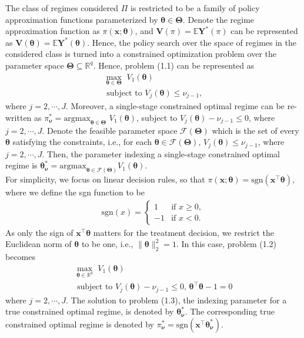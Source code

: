 \documentclass[12pt]{article}
\newcommand{\itl}{\intercal}
\newcommand{\bs}{ \boldsymbol}
\newcommand{\mb}{\mathbb}
\newcommand{\ml}{\mathcal}
\newcommand{\lt}{\left}
\newcommand{\rt}{\right}
\begin{document}
The class of regimes considered $\Pi$ is restricted to be a family of policy approximation functions parameterized by $\bs{\theta} \in \bs{\Theta}$. Denote the regime approximation function as $\pi(\bs{x}; \bs{\theta})$, and $\bs{V}(\pi) = \mb{E} {\bs{Y}^{*}\lt(\pi\rt)}$ can be represented as $\bs{V}(\bs{\theta}) = \mb{E} {\bs{Y}^{*}\lt(\bs{\theta}\rt)}$. Hence, the policy search over the space of regimes in the considered class is turned into a constrained optimization problem over the parameter space $\bs{\Theta} \subseteq \mb{R}^q$. Hence, problem (1.1) can be represented as 
\begin{equation}
\begin{gathered}
\max_{\bs{\theta} \in \bs{\Theta}} \,\, V_1\lt(\bs{\theta}\rt) \\
\text{ subject to } V_j\lt(\bs{\theta}\rt) \le \nu_{j-1},
\end{gathered}
\end{equation}  where $j = 2, \cdots, J$.  Moreover, a single-stage constrained optimal regime can be re-written as $\pi^*_{\bs{\nu}} = \text{argmax}_{\bs{\theta} \in \bs{\Theta}} \,\, V_1(\bs{\theta})$, subject to $V_j(\bs{\theta}) - \nu_{j-1} \le 0$, where $j = 2, \cdots, J$. Denote the feasible parameter space $\ml{F}(\bs{\Theta})$ which is the set of every $\bs{\theta}$ satisfying the constraints, i.e., for each $\bs{\theta} \in \ml{F}(\bs{\Theta})$, $V_j(\bs{\theta}) \le \nu_{j-1}$, where $j = 2, \cdots, J$. Then, the parameter indexing a single-stage constrained optimal regime is $\bs{\theta}^*_{\bs{\nu}} = \text{argmax}_{\bs{\theta}\in \ml{F}(\bs{\Theta})}V_1\lt(\bs{\theta}\rt)$. \\

For simplicity, we focus on linear decision rules, so that $\pi\lt(\bs{x};\bs{\theta}\rt)=\text{sgn}\lt(\bs{x}^{\itl}\bs{\theta}\rt)$, where we define the sgn function to be
\begin{gather*}
\text{sgn}(x)=\begin{cases}
1 & \mbox{if }x\ge0,\\
-1 & \mbox{if }x<0.
\end{cases}
\end{gather*}
As only the sign of $\bs{x}^{\itl}\bs{\theta}$ matters for the treatment decision, we restrict the Euclidean norm of $\bs{\theta}$ to be one, i.e., $\| \bs{\theta} \|_2^2=1$. In this case, problem (1.2) becomes
\begin{equation}
\begin{gathered}
\max_{\bs{\theta} \in \mb{R}^q}\,\,  V_1\lt(\bs{\theta}\rt) \\
\text{ subject to }  V_j\lt(\bs{\theta}\rt) - \nu_{j-1} \le 0, \, \bs{\theta}^{\itl}\bs{\theta} - 1 =0
\end{gathered}
\end{equation}
where $j = 2, \cdots, J$. The solution to problem (1.3), the indexing parameter for a true constrained optimal regime, is denoted by $\bs{\theta}_{\bs{\nu}}^*$. The corresponding true constrained optimal regime is denoted by $\pi_{\bs{\nu}}^* = \text{sgn}(\bs{x}^{\itl}\bs{\theta}_{\bs{\nu}}^*)$.
\end{document}
